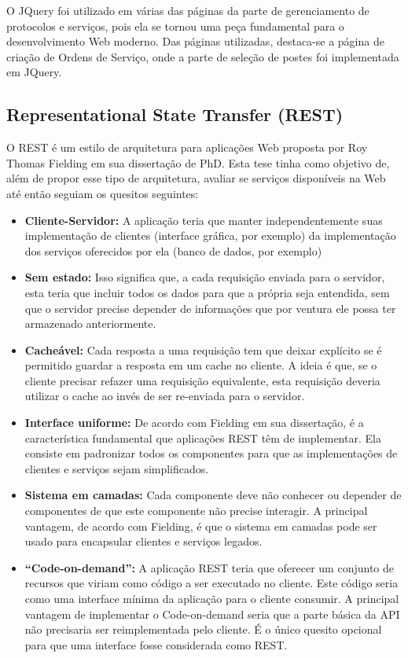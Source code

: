 \documentclass[
	article,			%
	11pt,				%
	oneside,			%
	a4paper,			%
	english,			%
	brazil,				%
	sumario=tradicional
	]{abntex2}
\begin{document}
O JQuery foi utilizado em várias das páginas da parte de gerenciamento de protocolos e serviços, pois ela se tornou uma peça fundamental para o desenvolvimento Web moderno.
Das páginas utilizadas, destaca-se a página de criação de Ordens de Serviço, onde a parte de seleção de postes foi implementada em JQuery.

\subsection{Representational State Transfer (REST)}

O REST é um estilo de arquitetura para aplicações Web proposta por Roy Thomas Fielding em sua dissertação de PhD. \cite{fielding}
Esta tese tinha como objetivo de, além de propor esse tipo de arquitetura, avaliar se serviços disponíveis na Web até então seguiam os quesitos seguintes:

\begin{itemize}
\item \textbf{Cliente-Servidor:} A aplicação teria que manter independentemente suas implementação de clientes (interface gráfica, por exemplo) da implementação dos serviços oferecidos por ela (banco de dados, por exemplo)

\item \textbf{Sem estado:} Isso significa que, a cada requisição enviada para o servidor, esta teria que incluir todos os dados para que a própria seja entendida, sem que o servidor precise depender de informações que por ventura ele possa ter armazenado anteriormente.

\item \textbf{Cacheável:} Cada resposta a uma requisição tem que deixar explícito se é permitido guardar a resposta em um cache no cliente.
A ideia é que, se o cliente precisar refazer uma requisição equivalente, esta requisição deveria utilizar o cache ao invés de ser re-enviada para o servidor.

\item \textbf{Interface uniforme:} De acordo com Fielding em sua dissertação, é a característica fundamental que aplicações REST têm de implementar.
Ela consiste em padronizar todos os componentes para que as implementações de clientes e serviços sejam simplificados.

\item \textbf{Sistema em camadas:} Cada componente deve não conhecer ou depender de componentes de que este componente não precise interagir.
A principal vantagem, de acordo com Fielding, é que o sistema em camadas pode ser usado para encapsular clientes e serviços legados.

\item \textbf{“Code-on-demand”:} A aplicação REST teria que oferecer um conjunto de recursos que viriam como código a ser executado no cliente.
Este código seria como uma interface mínima da aplicação para o cliente consumir.
A principal vantagem de implementar o Code-on-demand seria que a parte básica da API não precisaria ser reimplementada pelo cliente.
É o único quesito opcional para que uma interface fosse considerada como REST.
\end{itemize}
\end{document}
